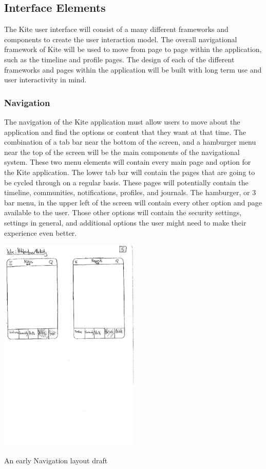 \documentclass[compsoc, 10, draftclsnofoot, onecolumn]{IEEEtran}
\begin{document}
\subsection{Interface Elements}
The Kite user interface will consist of a many different frameworks and components to create the user interaction model. The overall navigational framework of Kite will be used to move from page to page within the application, such as the timeline and profile pages. The design of each of the different frameworks and pages within the application will be built with long term use and user interactivity in mind.

\subsubsection{Navigation}
The navigation of the Kite application must allow users to move about the application and find the options or content that they want at that time. The combination of a tab bar near the bottom of the screen, and a hamburger menu near the top of the screen will be the main components of the navigational system. These two menu elements will contain every main page and option for the Kite application. The lower tab bar will contain the pages that are going to be cycled through on a regular basis. These pages will potentially contain the timeline, communities, notifications, profiles, and journals. The hamburger, or 3 bar menu, in the upper left of the screen will contain every other option and page available to the user. Those other options will contain the security settings, settings in general, and additional options the user might need to make their experience even better.
\begin{center}
\includegraphics[width=0.5\textwidth]{Notifications}

An early Navigation layout draft 
\end{center}
\end{document}
